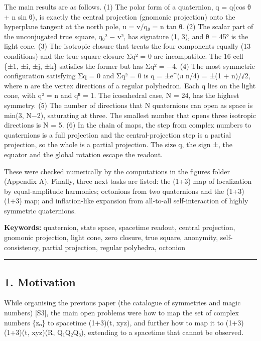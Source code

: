 \documentclass[
  a4paper,
]{article}
\begin{document}
The main results are as follows. (1) The polar form of a quaternion, q =
\textbar q\textbar(cos θ + n sin θ), is exactly the central projection
(gnomonic projection) onto the hyperplane tangent at the north pole, u =
v/q₀ = n tan θ. (2) The scalar part of the unconjugated true square, q₀²
− \textbar v\textbar², has signature (1, 3), and θ = 45° is the light
cone. (3) The isotropic closure that treats the four components equally
(13 conditions) and the true-square closure Σq² = 0 are incompatible.
The 16-cell \{±1, ±i, ±j, ±k\} satisfies the former but has Σq² = −4.
(4) The most symmetric configuration satisfying Σq = 0 and Σq² = 0 is q
= ±e\^{}(π n/4) = ±(1 + n)/√2, where n are the vertex directions of a
regular polyhedron. Each q lies on the light cone, with q² = n and q⁸ =
1. The icosahedral case, N = 24, has the highest symmetry. (5) The
number of directions that N quaternions can open as space is min(3,
N−2), saturating at three. The smallest number that opens three
isotropic directions is N = 5. (6) In the chain of maps, the step from
complex numbers to quaternions is a full projection and the
central-projection step is a partial projection, so the whole is a
partial projection. The size \textbar q\textbar, the sign ±, the equator
and the global rotation escape the readout.

These were checked numerically by the computations in the figures folder
(Appendix A). Finally, three next tasks are listed: the (1+3) map of
localization by equal-amplitude harmonics; octonions from two
quaternions and the (1+3)(1+3) map; and inflation-like expansion from
all-to-all self-interaction of highly symmetric quaternions.

\textbf{Keywords:} quaternion, state space, spacetime readout, central
projection, gnomonic projection, light cone, zero closure, true square,
anonymity, self-consistency, partial projection, regular polyhedra,
octonion

\begin{center}\rule{0.5\linewidth}{0.5pt}\end{center}

\subsection{1. Motivation}\label{motivation}

While organising the previous paper (the catalogue of symmetries and
magic numbers) {[}S3{]}, the main open problems were how to map the set
of complex numbers \{zₙ\} to spacetime (1+3)(t, xyz), and further how to
map it to (1+3)(1+3)(t, xyz)(R, Q₁Q₂Q₃), extending to a spacetime that
cannot be observed.
\end{document}
